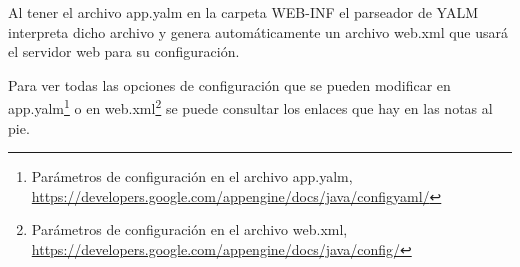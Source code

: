 Al tener el archivo app.yalm en la carpeta WEB-INF el parseador de YALM  interpreta dicho archivo y genera automáticamente un archivo web.xml que usará el servidor web para su configuración.

Para ver todas las opciones de configuración que se pueden modificar en app.yalm\footnote{ Parámetros de configuración en el archivo app.yalm, \url{https://developers.google.com/appengine/docs/java/configyaml/}} o en web.xml\footnote{ Parámetros de configuración en el archivo web.xml, \url{https://developers.google.com/appengine/docs/java/config/}} se puede consultar los enlaces que hay en las notas al pie.











